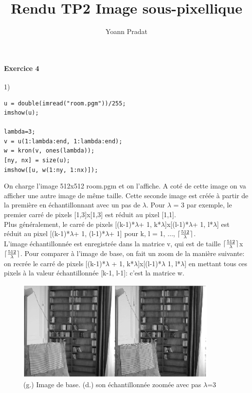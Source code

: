 \documentclass[a4paper, 11pt]{article}
\DeclarePairedDelimiter\ceil{\lceil}{\rceil}
\begin{document}
\title{Rendu TP2 Image sous-pixellique}
\author{Yoann Pradat}
\maketitle

\paragraph{Exercice 4}


1)
\begin{lstlisting}[frame=single]
u = double(imread("room.pgm"))/255;
imshow(u);

lambda=3;
v = u(1:lambda:end, 1:lambda:end);
w = kron(v, ones(lambda));
[ny, nx] = size(u);
imshow([u, w(1:ny, 1:nx)]);
\end{lstlisting}

On charge l'image 512x512 room.pgm et on l'affiche. A coté de cette image on va afficher une autre image de même taille.
Cette seconde image est créée à partir de la première en échantillonnant avec un pas de $\lambda$. Pour $\lambda$ = 3 par
exemple, le premier carré de pixels [1,3]x[1,3] est réduit au pixel [1,1]. \\

Plus généralement, le carré de pixels [(k-1)*$\lambda$+ 1, k*$\lambda$]x[(l-1)*$\lambda$+ 1, l*$\lambda$] est réduit au
pixel [(k-1)*$\lambda$+ 1, (l-1)*$\lambda$+ 1] pour k, l = 1, $\dots$, $\ceil{\frac{512}{\lambda}}$. \\

L'image échantillonnée est enregistrée dans la matrice v, qui est de taille
$\ceil{\frac{512}{\lambda}}$x$\ceil{\frac{512}{\lambda}}$. 
Pour comparer à l'image de base, on fait un zoom de la manière suivante: on recrée le carré de pixels [(k-1)*$\lambda$ +
1, k*$\lambda$]x[(l-1)*$\lambda$ 1, l*$\lambda$] en mettant tous ces pixels à la valeur échantillonnée [k-1, l-1]: c'est
la matrice w.

\begin{figure}[!h]
\centering
\includegraphics[width=10cm]{room.png}
\caption{(g.) Image de base. (d.) son échantillonnée zoomée avec pas $\lambda$=3}
\end{figure}
\end{document}
